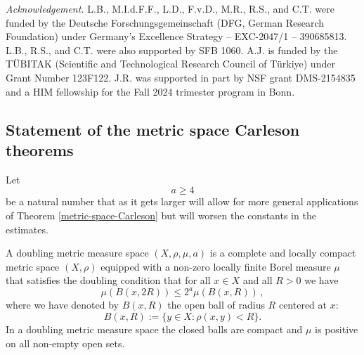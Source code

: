 \noindent \textit{Acknowledgement.}
L.B., M.I.d.F.F., L.D., F.v.D., M.R., R.S., and C.T. were funded by the Deutsche For\-schungs\-gemein\-schaft (DFG, German Research Foundation) under Germany's Excellence Strategy -- EXC-2047/1 -- 390685813.
L.B., R.S., and C.T. were also supported by SFB 1060.
A.J. is funded by the T\"UBITAK (Scientific and Technological Research Council of T\"urkiye) under Grant Number 123F122.
J.R. was supported in part by NSF grant DMS-2154835 and a HIM fellowship for the Fall 2024 trimester program in Bonn.

\subsection{Statement of the metric space Carleson theorems}

Let
\begin{equation}
    a\ge 4
\end{equation}
be a natural number that as it gets larger will allow for more general applications of Theorem \ref{metric-space-Carleson}
but will worsen the constants in the estimates.


A doubling metric measure space $(X,\rho,\mu, a)$ is a complete
and locally compact metric space $(X,\rho)$
equipped with a non-zero locally finite Borel measure $\mu$ that satisfies the doubling condition that for all $x\in X$ and all $R>0$ we have
\begin{equation}\label{doublingx}
    \mu(B(x,2R))\le 2^a\mu(B(x,R))\,,
\end{equation}
where we have denoted by $B(x,R)$ the open ball of radius $R$ centered at $x$:
\begin{equation}\label{eq-define-ball}
 B(x,R):=\{y\in X: \rho(x,y)<R\}. \end{equation}
In a doubling metric measure space the closed balls are compact and $\mu$ is positive on all non-empty open sets.

